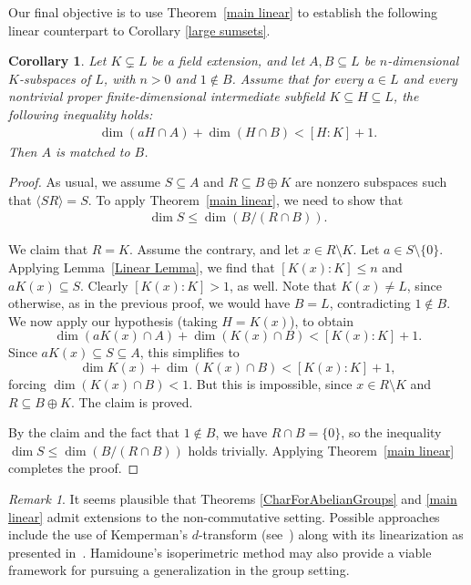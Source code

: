 \documentclass[11pt]{amsart}
\newtheorem{corollary}[theorem]{Corollary}
\theoremstyle{definition}
\theoremstyle{remark}
\newtheorem{remark}[theorem]{Remark}
\begin{document}
Our final objective is to use Theorem~\ref{main linear} to establish the following linear counterpart to Corollary \ref{large sumsets}.


\begin{corollary}
Let \( K \subsetneq L \) be a field extension, and let \( A, B \subseteq L \) be \( n \)-dimensional \( K \)-subspaces of \( L \), with \( n > 0 \) and \( 1 \notin B \). Assume that for every \( a \in L \) and every nontrivial proper finite-dimensional intermediate subfield \( K \subseteq H \subseteq L \), the following inequality holds:
\begin{align*}
    \dim(aH \cap A) + \dim(H \cap B) < [H : K] + 1.
\end{align*}
Then \( A \) is matched to \( B \).
\end{corollary}

\begin{proof}
As usual, we assume \( S \subseteq A \) and \( R \subseteq B \oplus K \) are nonzero subspaces such that \( \langle SR \rangle = S \). To apply Theorem~\ref{main linear}, we need to show that
\begin{align*}
\dim S \leq \dim (B/(R \cap B)).
\end{align*}


We claim that  \( R = K \). Assume the contrary, and let \( x \in R \setminus K \). Let \( a \in S \setminus \{ 0 \} \).  Applying Lemma~\ref{Linear Lemma}, we find that \( [K(x):K]\leq n \) and \( aK(x) \subseteq S \).  Clearly \( [K(x):K] > 1 \), as well. Note that \( K(x) \neq L \), since otherwise, as in the previous proof, we would have \( B = L \), contradicting \( 1 \notin B \). We now apply our hypothesis (taking \( H = K(x) \)), to obtain 
\[
\dim(aK(x) \cap A) + \dim(K(x) \cap B) < [K(x) : K] + 1.
\]
Since \( aK(x) \subseteq S \subseteq A \), this simplifies to 
\[
\dim K(x) + \dim(K(x) \cap B) < [K(x) : K] + 1,
\]
forcing \( \dim(K(x) \cap B) < 1\).  But this is impossible, since \( x \in R \setminus K \) and \( R \subseteq B \oplus K \). The claim is proved.

\medskip

By the claim and the fact that \( 1 \notin B \), we have \( R \cap B = \{ 0 \} \), so the inequality \( \dim S \leq \dim (B / (R \cap B)) \) holds trivially.  Applying Theorem~\ref{main linear} completes the proof.
\end{proof}

\begin{remark}
It seems plausible that Theorems \ref{CharForAbelianGroups} and \ref{main linear} admit extensions to the non-commutative setting.  Possible approaches include the use of Kemperman's \( d \)-transform (see~\cite{Olson}) along with its linearization as presented in~\cite{Eliahou 3}.  Hamidoune’s isoperimetric method \cite{Hamidoune2} may also provide a viable framework for pursuing a generalization in the group setting. 

\end{remark}
\bigskip
\end{document}
